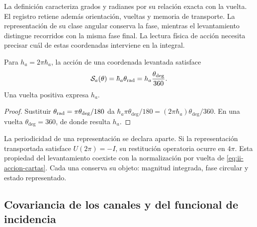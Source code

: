 La definición caracteriza grados y radianes por su relación exacta
con la vuelta. El registro retiene además orientación, vueltas y
memoria de transporte. La representación de su clase angular conserva
la fase, mientras el levantamiento distingue recorridos con la misma
fase final. La lectura física de acción necesita precisar cuál de
estas coordenadas interviene en la integral.

\begin{proposition}
Para \(h_a=2\pi\hbar_a\), la acción de una coordenada levantada
satisface
\begin{equation}
 \mathcal S_a(\theta)
 =\hbar_a\theta_{\rm rad}
 =h_a\frac{\theta_{\deg}}{360}.
 \label{eq:ii-accion-cartas}
\end{equation}
Una vuelta positiva expresa \(h_a\).
\end{proposition}
\begin{proof}
Sustituir \(\theta_{\rm rad}=\pi\theta_{\deg}/180\) da
\(\hbar_a\pi\theta_{\deg}/180
=(2\pi\hbar_a)\theta_{\deg}/360\). En una vuelta
\(\theta_{\deg}=360\), de donde resulta \(h_a\).
\end{proof}

La periodicidad de una representación se declara aparte. Si la
representación transportada satisface \(U(2\pi)=-I\), su restitución
operatoria ocurre en \(4\pi\). Esta propiedad del levantamiento
coexiste con la normalización por vuelta de
\eqref{eq:ii-accion-cartas}. Cada una conserva su objeto: magnitud
integrada, fase circular y estado representado.

\subsection{Covariancia de los canales y del funcional de incidencia}

